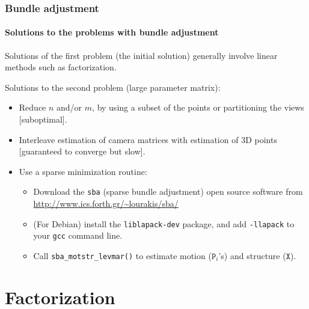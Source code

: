 \documentclass[aspectratio=169]{beamer}
\newcommand{\mat}[1]{\mathtt{#1}}
\begin{document}
\begin{frame}
\frametitle{Bundle adjustment}
\framesubtitle{Solutions to the problems with bundle adjustment}

Solutions of the first problem (the initial solution)
generally involve linear methods such as \alert{factorization}.

\medskip

Solutions to the second problem (large parameter matrix):
\begin{itemize}
\item Reduce $n$ and/or $m$, by using a subset of the points or
  partitioning the views [\alert{suboptimal}].
\item Interleave estimation of camera matrices with estimation of 3D
  points [guaranteed to converge but \alert{slow}].
\item Use a sparse minimization routine:
  \begin{itemize}
  \item Download the \texttt{sba} (sparse bundle adjustment) open
    source software from \url{http://www.ics.forth.gr/~lourakis/sba/}
  \item (For Debian) install the \texttt{liblapack-dev} package,
    and add \texttt{-llapack} to your \texttt{gcc} command line.
  \item Call \texttt{sba\_motstr\_levmar()} to estimate motion
    ($\mat{P}_i$'s) and structure ($\mat{X}$).
  \end{itemize}
\end{itemize}

\end{frame}


\section{Factorization}
\end{document}
